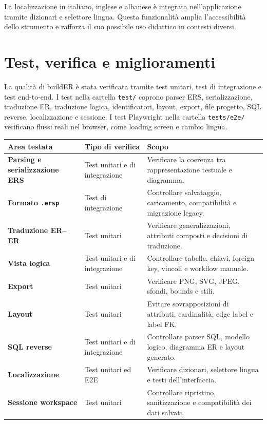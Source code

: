 \documentclass{unipd-thesis-modern}
\newcommand{\builder}{buildER}
\begin{document}
La localizzazione in italiano, inglese e albanese è integrata nell'applicazione tramite dizionari e selettore lingua. Questa funzionalità amplia l'accessibilità dello strumento e rafforza il suo possibile uso didattico in contesti diversi.

\chapter{Test, verifica e miglioramenti}

La qualità di \builder{} è stata verificata tramite test unitari, test di integrazione e test end-to-end. I test nella cartella \texttt{test/} coprono parser ERS, serializzazione, traduzione ER, traduzione logica, identificatori, layout, export, file progetto, SQL reverse, localizzazione e sessione. I test Playwright nella cartella \texttt{tests/e2e/} verificano flussi reali nel browser, come loading screen e cambio lingua.

\noindent\begin{tabularx}{\textwidth}{>{\bfseries}p{4cm}p{4cm}X}
Area testata & Tipo di verifica & Scopo \\
\hline
Parsing e serializzazione ERS & Test unitari e di integrazione & Verificare la coerenza tra rappresentazione testuale e diagramma. \\
Formato \texttt{.ersp} & Test di integrazione & Controllare salvataggio, caricamento, compatibilità e migrazione legacy. \\
Traduzione ER--ER & Test unitari & Verificare generalizzazioni, attributi composti e decisioni di traduzione. \\
Vista logica & Test unitari e di integrazione & Controllare tabelle, chiavi, foreign key, vincoli e workflow manuale. \\
Export & Test unitari & Verificare PNG, SVG, JPEG, sfondi, bounds e stili. \\
Layout & Test unitari & Evitare sovrapposizioni di attributi, cardinalità, edge label e label FK. \\
SQL reverse & Test unitari e di integrazione & Controllare parser SQL, modello logico, diagramma ER e layout generato. \\
Localizzazione & Test unitari ed E2E & Verificare dizionari, selettore lingua e testi dell'interfaccia. \\
Sessione workspace & Test unitari & Controllare ripristino, sanitizzazione e compatibilità dei dati salvati. \\
\end{tabularx}
\end{document}
